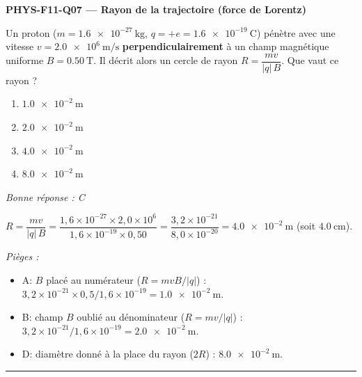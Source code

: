 \documentclass[11pt,a4paper]{article}
\newcommand{\vv}[1]{\vec{#1}}\newcommand{\ds}{\displaystyle}
\begin{document}
\noindent\textbf{PHYS-F11-Q07 --- Rayon de la trajectoire (force de Lorentz)}\par
Un proton ($m=\qty{1.6e-27}{\kilogram}$, $q=+e=\qty{1.6e-19}{\coulomb}$) pénètre avec une vitesse $v=\qty{2.0e6}{\metre\per\second}$ \textbf{perpendiculairement} à un champ magnétique uniforme $B=\qty{0.50}{\tesla}$. Il décrit alors un cercle de rayon $R=\dfrac{m v}{|q|\,B}$. Que vaut ce rayon ?
\begin{center}
\end{center}
\begin{enumerate}[label=\Alph*)]
\item $\qty{1.0e-2}{\metre}$
\item $\qty{2.0e-2}{\metre}$
\item $\qty{4.0e-2}{\metre}$
\item $\qty{8.0e-2}{\metre}$
\end{enumerate}
\textit{Bonne réponse : C}\par
$R=\dfrac{m v}{|q|\,B}=\dfrac{1{,}6\times10^{-27}\times2{,}0\times10^{6}}{1{,}6\times10^{-19}\times0{,}50}=\dfrac{3{,}2\times10^{-21}}{8{,}0\times10^{-20}}=\qty{4.0e-2}{\metre}$ (soit $\qty{4.0}{\centi\metre}$).\par
\textit{Pièges :}
\begin{itemize}
\item A: $B$ placé au numérateur ($R=mvB/|q|$) : $3{,}2\times10^{-21}\times0{,}5/1{,}6\times10^{-19}=\qty{1.0e-2}{\metre}$.
\item B: champ $B$ oublié au dénominateur ($R=mv/|q|$) : $3{,}2\times10^{-21}/1{,}6\times10^{-19}=\qty{2.0e-2}{\metre}$.
\item D: diamètre donné à la place du rayon ($2R$) : $\qty{8.0e-2}{\metre}$.
\end{itemize}
\vspace{8pt}\hrule\vspace{8pt}
\end{document}
